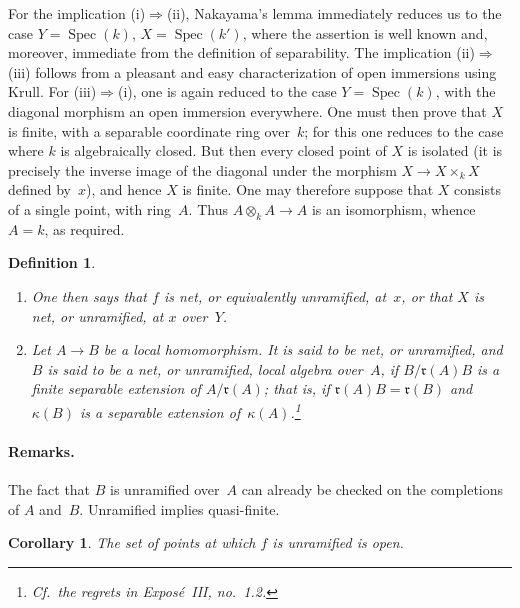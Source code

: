 \documentclass[11pt,oneside]{amsbook}
\newtheorem{corollary}[proposition]{Corollary}
\newtheorem{definition}[proposition]{Definition}
\begin{document}
For the implication \textup{(i)}\(\Rightarrow\)\textup{(ii)}, Nakayama's
lemma immediately reduces us to the case
\(Y=\operatorname{Spec}(k)\), \(X=\operatorname{Spec}(k')\), where the
assertion is well known and, moreover, immediate from the definition of
separability.  The implication \textup{(ii)}\(\Rightarrow\)\textup{(iii)}
follows from a pleasant and easy characterization of open immersions using
Krull.  For \textup{(iii)}\(\Rightarrow\)\textup{(i)}, one is
again reduced to the case \(Y=\operatorname{Spec}(k)\), with the diagonal
morphism an open immersion everywhere.  One must then prove that \(X\) is
finite, with a separable coordinate ring over~\(k\); for this one reduces to
the case where \(k\) is algebraically closed.  But then every closed point of
\(X\) is isolated (it is precisely the inverse image of the diagonal under
the morphism \(X\to X\times_k X\) defined by~\(x\)), and hence \(X\) is
finite.  One may therefore suppose that \(X\) consists of a single point,
with ring~\(A\).  Thus \(A\otimes_kA\to A\) is an isomorphism, whence
\(A=k\), as required.

\begin{definition}
\label{I.3.2}
\begin{enumerate}
\item[(a)] One then says that \(f\) is \emph{net}, or equivalently
  \emph{unramified}, at~\(x\), or that \(X\) is net, or unramified, at
  \(x\) over~\(Y\).
\item[(b)] Let \(A\to B\) be a local homomorphism.  It is said to be
  \emph{net}, or \emph{unramified}, and \(B\) is said to be a net, or
  unramified, local algebra over~\(A\), if
  \(B/\mathfrak r(A)B\) is a finite separable extension of
  \(A/\mathfrak r(A)\); that is, if
  \(\mathfrak r(A)B=\mathfrak r(B)\) and \(\kappa(B)\) is a separable
  extension of~\(\kappa(A)\).\footnote{Cf.\ the regrets in
  Expos\'e~III, no.~1.2.}
\end{enumerate}
\end{definition}

\paragraph{Remarks.}
The fact that
\(B\) is unramified over~\(A\) can already be checked on the completions of
\(A\) and~\(B\).  Unramified implies quasi-finite.

\begin{corollary}
\label{I.3.3}
The set of points at which \(f\) is unramified is open.
\end{corollary}
\end{document}
